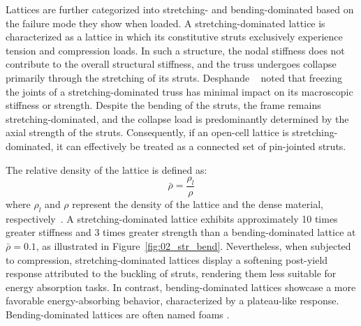 Lattices are further categorized into stretching- and bending-dominated based on the failure mode they show when loaded. A stretching-dominated lattice is characterized as a lattice in which its constitutive struts exclusively experience tension and compression loads. In such a structure, the nodal stiffness does not contribute to the overall structural stiffness, and the truss undergoes collapse primarily through the stretching of its struts. Desphande \etal~\cite{deshpande_foam_2001} noted that freezing the joints of a stretching-dominated truss has minimal impact on its macroscopic stiffness or strength. Despite the bending of the struts, the frame remains stretching-dominated, and the collapse load is predominantly determined by the axial strength of the struts. Consequently, if an open-cell lattice is stretching-dominated, it can effectively be treated as a connected set of pin-jointed struts.

The relative density of the lattice is defined as:
\begin{equation}
    \bar{\rho} = \frac{\rho_l}{\rho}
\end{equation}
where $\rho_l$ and $\rho$ represent the density of the lattice and the dense material, respectively~. A stretching-dominated lattice exhibits approximately 10 times greater stiffness and 3 times greater strength than a bending-dominated lattice at $\bar{\rho} = 0.1$, as illustrated in Figure~\ref{fig:02_str_bend}. Nevertheless, when subjected to compression, stretching-dominated lattices display a softening post-yield response attributed to the buckling of struts, rendering them less suitable for energy absorption tasks. In contrast, bending-dominated lattices showcase a more favorable energy-absorbing behavior, characterized by a plateau-like response. Bending-dominated lattices are often named foams \cite{ashby_properties_2006}.

